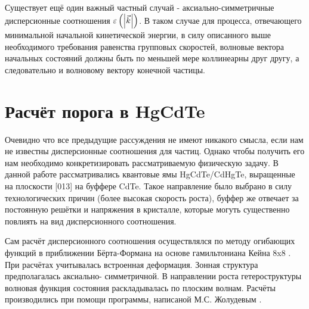 \documentclass[../main.tex]{subfiles}
\begin{document}




    Существует ещё один важный частный случай - аксиально-симметричные дисперсионные
    соотношения $\varepsilon\left(\abs{\vec k}\right)$. В таком случае для процесса,
    отвечающего минимальной начальной кинетической энергии, в силу описанного выше 
    необходимого требования равенства групповых скоростей, волновые вектора начальных
    состояний должны быть по меньшей мере коллинеарны друг другу, а следовательно и 
    волновому вектору конечной частицы.

    \section{Расчёт порога в HgCdTe}

        Очевидно что все предыдущие рассуждения не имеют никакого смысла, если нам не известны дисперсионные 
        соотношения для частиц. Однако чтобы получить его нам необходимо конкретизировать
        рассматриваемую физическую задачу. В данной работе рассматривались квантовые ямы HgCdTe/CdHgTe, выращенные 
        на плоскости [013] на буффере CdTe. Такое направление было выбрано в силу технологических причин (более
        высокая скорость роста), буффер же отвечает за постоянную решётки и напряжения в кристалле,
        которые могуть существенно повлиять на вид дисперсионного соотношения.

        Сам расчёт дисперсионного соотношения осуществлялся по методу огибающих функций
        в приближении Бёрта-Формана на основе гамильтониана Кейна 8x8 \cite{Novik:2005}. При расчётах
        учитывалась встроенная деформация. Зонная структура предполагалась аксиально-
        симметричной. В направлении роста гетероструктуры волновая функция состояния
        раскладывалась по плоским волнам. Расчёты производились при помощи программы,
        написаной М.С. Жолудевым \cite{Zholudev:PRB:2012}.
\end{document}
